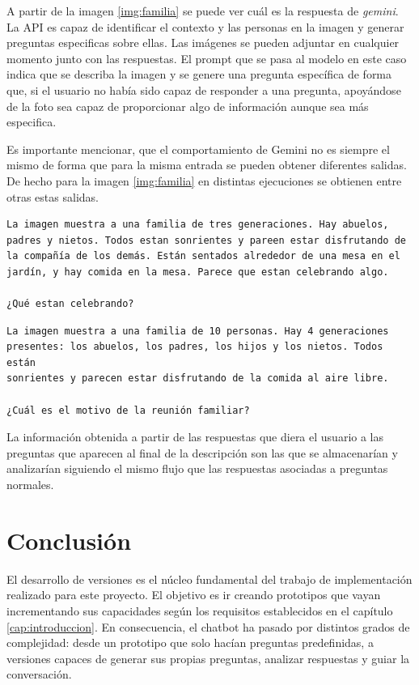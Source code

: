 A partir de la imagen \ref{img:familia} se puede ver cuál es la respuesta de \textit{gemini}. La API es capaz de identificar el contexto y las personas en la imagen y generar preguntas especificas sobre ellas. Las imágenes se pueden adjuntar en cualquier momento junto con las respuestas. El prompt que se pasa al modelo en este caso indica que se describa la imagen y se genere una pregunta específica de forma que, si el usuario no había sido capaz de responder a una pregunta, apoyándose de la foto sea capaz de proporcionar algo de información aunque sea más especifica. 

Es importante mencionar, que el comportamiento de Gemini no es siempre el mismo de forma que para la misma entrada se pueden obtener diferentes salidas. De hecho para la imagen \ref{img:familia} en distintas ejecuciones se obtienen entre otras estas salidas. 

\begin{verbatim}
La imagen muestra a una familia de tres generaciones. Hay abuelos,
padres y nietos. Todos estan sonrientes y pareen estar disfrutando de
la compañía de los demás. Están sentados alrededor de una mesa en el
jardín, y hay comida en la mesa. Parece que estan celebrando algo. 
   
¿Qué estan celebrando? 
\end{verbatim}

\begin{verbatim}
La imagen muestra a una familia de 10 personas. Hay 4 generaciones
presentes: los abuelos, los padres, los hijos y los nietos. Todos están
sonrientes y parecen estar disfrutando de la comida al aire libre. 

¿Cuál es el motivo de la reunión familiar?  
\end{verbatim}

La información obtenida a partir de las respuestas que diera el usuario a las preguntas que aparecen al final de la descripción son las que se almacenarían y analizarían siguiendo el mismo flujo que las respuestas asociadas a preguntas normales. 
\section{Conclusión}
El desarrollo de versiones es el núcleo fundamental del trabajo de implementación realizado para este proyecto. El objetivo es ir creando prototipos que vayan incrementando sus capacidades según los requisitos establecidos en el capítulo \ref{cap:introduccion}. En consecuencia, el chatbot ha pasado por distintos grados de complejidad: desde un prototipo que solo hacían preguntas predefinidas, a versiones capaces de generar sus propias preguntas, analizar respuestas y guiar la conversación. 

